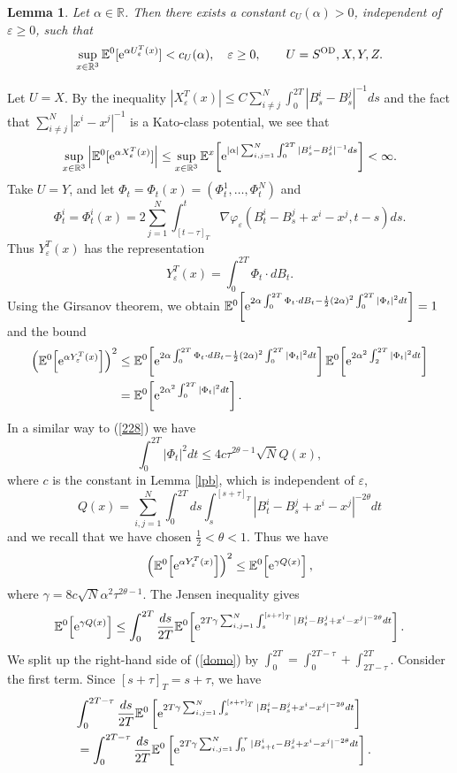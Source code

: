 \documentclass[11pt]{article}
\newtheorem{lemma}[theorem]{Lemma}
\newcommand{\bl}[1]{\begin{lemma}\label{#1}}
\newcommand{\el}{\end{lemma}}
\newcommand{\Ebb}{{\mathbb E}}
\providecommand{\eq}[1]{\begin{equation}\label{#1}}
\providecommand{\en}{\end{equation}}
\renewcommand{\d}{\displaystyle}
\providecommand{\BR}{{\mathbb{R}^3 }}
\providecommand{\iijj}{\sum_{i,j=1}^N}
\renewcommand{\ij}{\sum_{i\not=j}^N}
\providecommand{\od}{{\rm OD}}
\providecommand{\RR}{\mathbb{R}}
\providecommand{\kak}[1]{(\ref{#1})}
\providecommand{\lk}{\left(}
\providecommand{\rk}{\right)}
\providecommand{\half}{\frac{1}{2}}
\providecommand{\non}{\nonumber}
\providecommand{\e}{{\rm e}}
\providecommand{\1}{\mathbb{1}}
\providecommand{\eps}{\varepsilon}
\newcounter {constant}
\begin{document}
\bl{supexp}
Let $\alpha\in\RR$. Then there exists a constant $c_U(\alpha)>0$, independent of $\eps\geq0$, such that
\eq{koukou}
\sup_{x\in\BR}\Ebb^0[\e^{\alpha U_\eps^T(x)}]<c_U(\alpha),\quad \eps\geq0,\qquad U=S^{\od}, X,Y,Z.
\en
\el
\proof
Let $U=X$. By the inequality $|X_\eps^T(x)|\leq C\ij \int_0^{2T}{|B_s^i-B_s^j|}^{-1} ds$ and the fact that
$\ij  {|x^i-x^j|}^{-1}$ is a Kato-class potential, we see that
\eq{XX}
\sup_{x\in\BR}\left|\Ebb^0[\e^{\alpha X_\eps^T(x)}]\right|
\leq \sup_{x\in\BR}\Ebb^x\!\left[\e^{|\alpha| \iijj \int_0^{2T}|B_s^i-B_s^j|^{-1} ds}\right]<\infty.
\en
Take $U=Y$, and let $\Phi_t=\Phi_t(x)=(\Phi_t^1,\ldots,\Phi_t^N)$ and
$$
\d \Phi_t^i =\Phi_t^i(x)=2 \sum_{j=1}^N \int^t_{[t-\tau]_T}\nabla \varphi_\eps (B_t^i-B_s^j+x^i-x^j,t-s)ds.
$$
Thus $Y_\eps^T(x)$ has the representation
\begin{equation}
\label{eq:WI-renorm-1-bism}
Y_\eps^T(x) = \int_{0}^{2T} \Phi_t\cdot dB_t.
\end{equation}
Using the Girsanov theorem,  we obtain $\Ebb^0\!\left[\e^{2\alpha \int_0^ {2T} \Phi_t \cdot
dB_t-\half(2\alpha )^2\int_0^ {2T} |\Phi_t|^2 dt}\right] =1$ and the bound
\begin{align*}
\lk \Ebb^0\!\left[\e^{\alpha Y_\eps^T(x)}\right] \rk ^2
&\leq
\Ebb^0\!\left[\e^{2\alpha \int_0^ {2T} \Phi_t \cdot dB_t-\half(2\alpha )^2\int_0^ {2T} |\Phi_t|^2 dt}\right]
\Ebb^0\!\left[\e^{2\alpha ^2 \int_2^ {2T} |\Phi_t|^2 dt}\right] \\
&=
\Ebb^0\!\left[\e^{2\alpha ^2\int_0^{2 T} |\Phi_t|^2 dt}\right].
\end{align*}
In a similar way to \kak{228} we have
$$
\int_0^ {2T} |\Phi_t|^2 dt\leq 4 c\tau^{2\theta-1}\sqrt N  Q(x),
$$
where $c$ is the constant in Lemma \ref{lpb}, which is independent of $\eps$,
$$
Q(x)= \iijj \int_0^{2T} ds \int_s^{[s+\tau]_T} |B_t^i-B_s^j+x^i-x^j |^{-2\theta} dt
$$
and we recall that we have chosen $\half <\theta <1$. Thus we have
\eq{na2-occ1}
\lk \Ebb^0\!\left[\e^{\alpha    Y_\eps^T(x)}\right] \rk^2
\leq
\Ebb^0\!\left[\e^{\gamma  Q(x)}\right],
\en
where  $\gamma=8 c\sqrt N \alpha^2\tau^{2\theta-1}$. The Jensen inequality gives
\eq{domo}
\Ebb^0\!\left[\e^{\gamma Q(x)} \right]  \le \int_0^{2T} \frac{ds}{2T}
\Ebb^0\!\left[\e^{2 T\gamma \iijj \int_s^{[s+\tau]_T} |B_t^i -B_s^j +x^i-x^j|^{-2\theta} dt} \right].
\en
We split up the right-hand  side of \kak{domo} by $\int_0^{2T}= \int_{0}^{2T-\tau}+\int_{2T-\tau}^{2T}$.
Consider the first term. Since $[s+\tau]_T=s+\tau$, we have
\begin{eqnarray}
\lefteqn{
\int_0^{2T-\tau}\frac{ds}{2T}
\Ebb^0 \left[\e^{2 T\gamma \iijj \int_s^{[s+\tau]_T} |B_t^i-B_s^j +x^i-x^j|^{-2\theta} dt }\right] }
\non \\
&\label{proof}
=
\int_0^{2T-\tau}\frac{ds}{2T}
\Ebb^0 \left[\e^{2 T\gamma \iijj \int_0^{\tau} |B_{s+t}^i-B_s^j+x^i-x^j|^{-2\theta} dt }\right].
\end{eqnarray}
\end{document}
